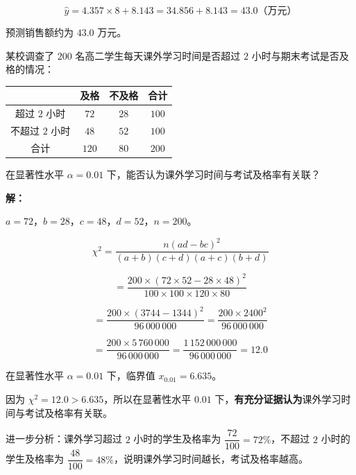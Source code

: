 \documentclass[12pt, a4paper]{ctexart}
\begin{document}
\[
\hat{y} = 4.357 \times 8 + 8.143 = 34.856 + 8.143 = 43.0 \text{（万元）}
\]

预测销售额约为 $\boxed{43.0}$ 万元。

\bigskip

\begin{appbox}[【应用2】学习习惯与成绩]
某校调查了 $200$ 名高二学生每天课外学习时间是否超过 $2$ 小时与期末考试是否及格的情况：

\begin{center}
\begin{tabular}{c|cc|c}
\toprule
 & 及格 & 不及格 & 合计 \\
\midrule
超过 $2$ 小时 & $72$ & $28$ & $100$ \\
不超过 $2$ 小时 & $48$ & $52$ & $100$ \\
\midrule
合计 & $120$ & $80$ & $200$ \\
\bottomrule
\end{tabular}
\end{center}

在显著性水平 $\alpha = 0.01$ 下，能否认为课外学习时间与考试及格率有关联？
\end{appbox}

\textbf{解：}

$a = 72$，$b = 28$，$c = 48$，$d = 52$，$n = 200$。

\[
\chi^2 = \frac{n(ad - bc)^2}{(a+b)(c+d)(a+c)(b+d)}
\]

\[
= \frac{200 \times (72\times52 - 28\times48)^2}{100 \times 100 \times 120 \times 80}
\]

\[
= \frac{200 \times (3744 - 1344)^2}{96\,000\,000} = \frac{200 \times 2400^2}{96\,000\,000}
\]

\[
= \frac{200 \times 5\,760\,000}{96\,000\,000} = \frac{1\,152\,000\,000}{96\,000\,000} = 12.0
\]

\medskip
在显著性水平 $\alpha = 0.01$ 下，临界值 $x_{0.01} = 6.635$。

\medskip
因为 $\chi^2 = 12.0 > 6.635$，所以在显著性水平 $0.01$ 下，\textbf{有充分证据认为}课外学习时间与考试及格率有关联。

\medskip
进一步分析：课外学习超过 $2$ 小时的学生及格率为 $\dfrac{72}{100} = 72\%$，不超过 $2$ 小时的学生及格率为 $\dfrac{48}{100} = 48\%$，说明课外学习时间越长，考试及格率越高。

\bigskip
\end{document}
